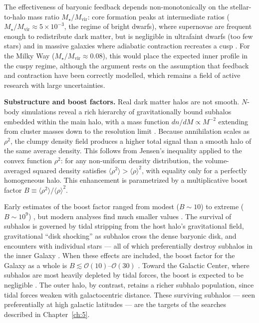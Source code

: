The effectiveness of baryonic feedback depends non-monotonically on the stellar-to-halo mass ratio $M_\star / M_\text{vir}$: core formation peaks at intermediate ratios ($M_\star / M_\text{vir} \approx 5 \times 10^{-3}$, the regime of bright dwarfs), where supernovae are frequent enough to redistribute dark matter, but is negligible in ultrafaint dwarfs (too few stars) and in massive galaxies where adiabatic contraction recreates a cusp \cite{Bullock:2017xww}.
For the Milky Way ($M_\star / M_\text{vir} \approx 0.08$), this would place the expected inner profile in the cuspy regime, although the argument rests on the assumption that feedback and contraction have been correctly modelled, which remains a field of active research with large uncertainties.

\textbf{Substructure and boost factors.}
Real dark matter halos are not smooth.
$N$-body simulations reveal a rich hierarchy of gravitationally bound subhalos embedded within the main halo, with a mass function $dn/dM \propto M^{-2}$ extending from cluster masses down to the resolution limit \cite{Springel:2008cc,Diemand:2008in,Cirelli:2024ssz}.
Because annihilation scales as $\rho^2$, the clumpy density field produces a higher total signal than a smooth halo of the same average density.
This follows from Jensen's inequality applied to the convex function $\rho^2$: for any non-uniform density distribution, the volume-averaged squared density satisfies $\langle \rho^2 \rangle > \langle \rho \rangle^2$, with equality only for a perfectly homogeneous halo.
This enhancement is parametrized by a multiplicative boost factor $B \equiv \langle \rho^2 \rangle / \langle \rho \rangle^2$.

Early estimates of the boost factor ranged from modest ($B \sim 10$) to extreme ($B \sim 10^9$) \cite{Bergstrom:1998jj,Calcaneo-Roldan:2000xwm,Berezinsky:2003vn,Stoehr:2003hf}, but modern analyses find much smaller values \cite{Lavalle:2007apj,Sanchez-Conde:2013yxa}.
The survival of subhalos is governed by tidal stripping from the host halo's gravitational field, gravitational ``disk shocking'' as subhalos cross the dense baryonic disk, and encounters with individual stars --- all of which preferentially destroy subhalos in the inner Galaxy \cite{Sanchez-Conde:2013yxa}.
When these effects are included, the boost factor for the Galaxy as a whole is $B \lesssim \mathcal{O}(10)$--$\mathcal{O}(30)$ \cite{Sanchez-Conde:2013yxa,Moline:2016pbm}.
Toward the Galactic Center, where subhalos are most heavily depleted by tidal forces, the boost is expected to be negligible \cite{Sanchez-Conde:2013yxa}.
The outer halo, by contrast, retains a richer subhalo population, since tidal forces weaken with galactocentric distance. These surviving subhalos --- seen preferentially at high galactic latitudes --- are the targets of the searches described in Chapter~\ref{ch:5}.

